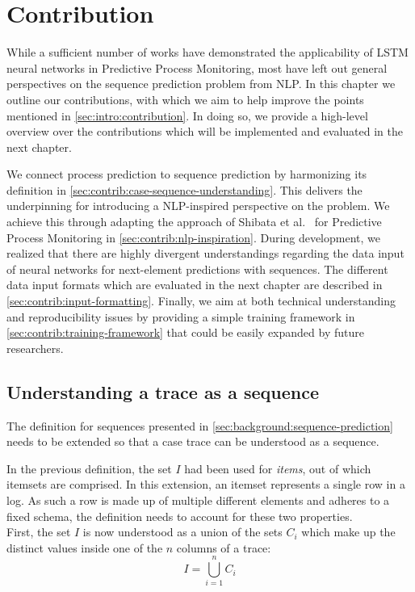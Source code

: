 \chapter{Contribution}\label{chap:contribution}
While a sufficient number of works have demonstrated the applicability of LSTM neural networks in Predictive Process Monitoring, most have left out general perspectives on the sequence prediction problem from NLP.
In this chapter we outline our contributions, with which we aim to help improve the points mentioned in \autoref{sec:intro:contribution}. In doing so, we provide a high-level overview over the contributions which will be implemented and evaluated in the next chapter.

We connect process prediction to sequence prediction by harmonizing its definition in \autoref{sec:contrib:case-sequence-understanding}. This delivers the underpinning for introducing a NLP-inspired perspective on the problem. We achieve this through adapting the approach of Shibata et al.~\cite{shibata2016bipartite} for Predictive Process Monitoring in \autoref{sec:contrib:nlp-inspiration}. During development, we realized that there are highly divergent understandings regarding the data input of neural networks for next-element predictions with sequences. The different data input formats which are evaluated in the next chapter are described in \autoref{sec:contrib:input-formatting}. Finally, we aim at both technical understanding and reproducibility issues by providing a simple training framework in \autoref{sec:contrib:training-framework} that could be easily expanded by future researchers.

\section{Understanding a trace as a sequence}
\label{sec:contrib:case-sequence-understanding} 
The definition for sequences presented in \autoref{sec:background:sequence-prediction} needs to be extended so that a case trace can be understood as a sequence.

In the previous definition, the set $I$ had been used for \textit{items}, out of which itemsets are comprised. In this extension, an itemset represents a single row in a log. As such a row is made up of multiple different elements and adheres to a fixed schema, the definition needs to account for these two properties.\\

First, the set $I$ is now understood as a union of the sets $C_i$ which make up the distinct values inside one of the $n$ columns of a trace:
$$I = \bigcup\limits_{i=1}^{n} C_{i}$$

